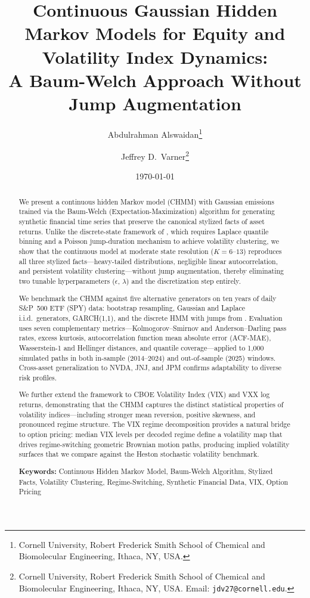 \documentclass[11pt,a4paper]{article}
\title{Continuous Gaussian Hidden Markov Models for Equity and Volatility Index Dynamics:\\A Baum-Welch Approach Without Jump Augmentation}
\author{
    Abdulrahman Alswaidan\thanks{Cornell University, Robert Frederick Smith School of Chemical and Biomolecular Engineering, Ithaca, NY, USA.}
    \and
    Jeffrey D.\ Varner\thanks{Cornell University, Robert Frederick Smith School of Chemical and Biomolecular Engineering, Ithaca, NY, USA. Email: \texttt{jdv27@cornell.edu}.}
}
\date{\today}
\begin{document}
\maketitle

\begin{abstract}
We present a continuous hidden Markov model (CHMM) with Gaussian emissions trained via the Baum-Welch (Expectation-Maximization) algorithm for generating synthetic financial time series that preserve the canonical stylized facts of asset returns.
Unlike the discrete-state framework of \citet{alswaidan2026hybrid}, which requires Laplace quantile binning and a Poisson jump-duration mechanism to achieve volatility clustering, we show that the continuous model at moderate state resolution ($K = 6$--$13$) reproduces all three stylized facts---heavy-tailed distributions, negligible linear autocorrelation, and persistent volatility clustering---without jump augmentation, thereby eliminating two tunable hyperparameters ($\epsilon$, $\lambda$) and the discretization step entirely.

We benchmark the CHMM against five alternative generators on ten years of daily S\&P~500 ETF (SPY) data: bootstrap resampling, Gaussian and Laplace i.i.d.\ generators, GARCH(1,1), and the discrete HMM with jumps from \citet{alswaidan2026hybrid}.
Evaluation uses seven complementary metrics---Kolmogorov--Smirnov and Anderson--Darling pass rates, excess kurtosis, autocorrelation function mean absolute error (ACF-MAE), Wasserstein-1 and Hellinger distances, and quantile coverage---applied to 1,000 simulated paths in both in-sample (2014--2024) and out-of-sample (2025) windows.
Cross-asset generalization to NVDA, JNJ, and JPM confirms adaptability to diverse risk profiles.

We further extend the framework to CBOE Volatility Index (VIX) and VXX log returns, demonstrating that the CHMM captures the distinct statistical properties of volatility indices---including stronger mean reversion, positive skewness, and pronounced regime structure.
The VIX regime decomposition provides a natural bridge to option pricing: median VIX levels per decoded regime define a volatility map that drives regime-switching geometric Brownian motion paths, producing implied volatility surfaces that we compare against the Heston stochastic volatility benchmark.

\bigskip\noindent
\textbf{Keywords:} Continuous Hidden Markov Model, Baum-Welch Algorithm, Stylized Facts, Volatility Clustering, Regime-Switching, Synthetic Financial Data, VIX, Option Pricing
\end{abstract}
\end{document}
